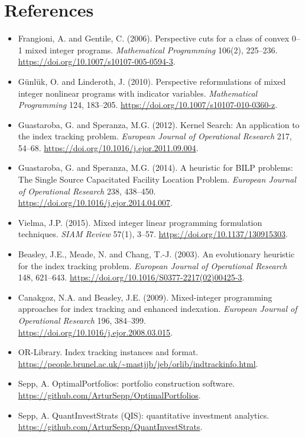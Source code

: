 \documentclass[11pt]{article}
\begin{document}
\section{References}
\begin{itemize}[leftmargin=*,itemsep=0.65em]
\item Frangioni, A. and Gentile, C. (2006). Perspective cuts for a class of
convex 0--1 mixed integer programs. \emph{Mathematical Programming} 106(2),
225--236. \url{https://doi.org/10.1007/s10107-005-0594-3}.
\item G\"unl\"uk, O. and Linderoth, J. (2010). Perspective reformulations of
mixed integer nonlinear programs with indicator variables. \emph{Mathematical
Programming} 124, 183--205. \url{https://doi.org/10.1007/s10107-010-0360-z}.
\item Guastaroba, G. and Speranza, M.G. (2012). Kernel Search: An application
to the index tracking problem. \emph{European Journal of Operational Research} 217,
54--68. \url{https://doi.org/10.1016/j.ejor.2011.09.004}.
\item Guastaroba, G. and Speranza, M.G. (2014). A heuristic for BILP problems:
The Single Source Capacitated Facility Location Problem. \emph{European
Journal of Operational Research} 238, 438--450.
\url{https://doi.org/10.1016/j.ejor.2014.04.007}.
\item Vielma, J.P. (2015). Mixed integer linear programming formulation
techniques. \emph{SIAM Review} 57(1), 3--57.
\url{https://doi.org/10.1137/130915303}.
\item Beasley, J.E., Meade, N. and Chang, T.-J. (2003). An evolutionary
heuristic for the index tracking problem. \emph{European Journal of
Operational Research} 148, 621--643.
\url{https://doi.org/10.1016/S0377-2217(02)00425-3}.
\item Canakgoz, N.A. and Beasley, J.E. (2009). Mixed-integer programming
approaches for index tracking and enhanced indexation. \emph{European Journal
of Operational Research} 196, 384--399.
\url{https://doi.org/10.1016/j.ejor.2008.03.015}.
\item OR-Library. Index tracking instances and format.
\url{https://people.brunel.ac.uk/~mastjjb/jeb/orlib/indtrackinfo.html}.
\item Sepp, A. OptimalPortfolios: portfolio construction software.
\url{https://github.com/ArturSepp/OptimalPortfolios}.
\item Sepp, A. QuantInvestStrats (QIS): quantitative investment analytics.
\url{https://github.com/ArturSepp/QuantInvestStrats}.
\end{itemize}
\end{document}
